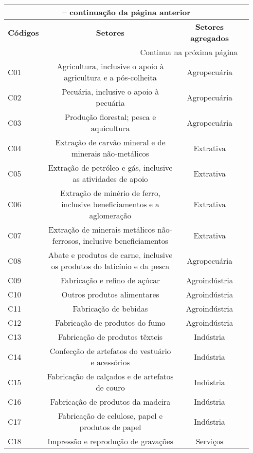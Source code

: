 \begin{apendicesenv}
\begin{small}
\begin{center}
\begin{longtable}{lccc}
				\multicolumn{3}{c}{{\bfseries \tablename\ \thetable{} -- continuação da página anterior}} \\
				\hline
				\multirow{2}{*}{\textbf{Códigos}} & \multirow{2}{*}{\textbf{Setores}} & \multirow{2}{*}{\textbf{Setores agregados}} \\
				&  &  \\ \hline \endhead

				\hline \multicolumn{3}{r}{{Continua na próxima página}} \\ \hline
				\endfoot

				\hline \endlastfoot

				C01 & Agricultura, inclusive o apoio à   agricultura e a pós-colheita & Agropecuária \\
				C02 & Pecuária, inclusive o apoio à pecuária & Agropecuária \\
				C03 & Produção florestal; pesca e aquicultura & Agropecuária \\
				C04 & Extração de carvão mineral e de minerais não-metálicos & Extrativa \\
				C05 & Extração de petróleo e gás, inclusive as atividades de apoio & Extrativa \\
				C06 & Extração de minério de ferro, inclusive beneficiamentos e a aglomeração & Extrativa \\
				C07 & Extração de minerais metálicos não-ferrosos, inclusive beneficiamentos & Extrativa \\
				C08 & Abate e produtos de carne, inclusive os produtos do laticínio e da pesca & Agropecuária \\
				C09 & Fabricação e refino de açúcar & Agroindústria \\
				C10 & Outros produtos alimentares & Agroindústria \\
				C11 & Fabricação de bebidas & Agroindústria \\
				C12 & Fabricação de produtos do fumo & Agroindústria \\
				C13 & Fabricação de produtos têxteis & Indústria \\
				C14 & Confecção de artefatos do vestuário e acessórios & Indústria \\
				C15 & Fabricação de calçados e de artefatos de couro & Indústria \\
				C16 & Fabricação de produtos da madeira & Indústria \\
				C17 & Fabricação de celulose, papel e produtos de papel & Indústria \\
				C18 & Impressão e reprodução de gravações & Serviços \\

\end{longtable}
\end{center}
\end{small}
\end{apendicesenv}
